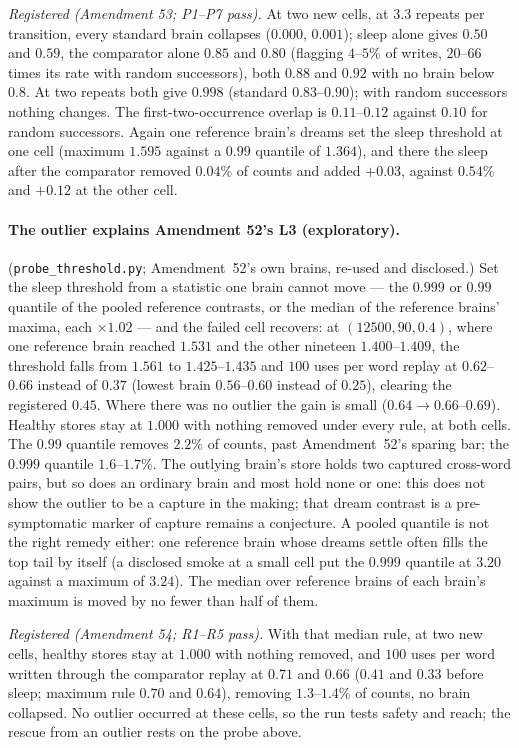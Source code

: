 \documentclass[11pt]{article}
\theoremstyle{definition}
\theoremstyle{plain}
\begin{document}
\emph{Registered (Amendment 53; P1--P7 pass).} At two new cells, at $3.3$
repeats per transition, every standard brain collapses ($0.000$, $0.001$); sleep
alone gives $0.50$ and $0.59$, the comparator alone $0.85$ and $0.80$ (flagging
$4$--$5\%$ of writes, $20$--$66$ times its rate with random successors), both
$0.88$ and $0.92$ with no brain below $0.8$. At two repeats both give $0.998$
(standard $0.83$--$0.90$); with random successors nothing changes. The
first-two-occurrence overlap is $0.11$--$0.12$ against $0.10$ for random
successors. Again one reference brain's dreams set the sleep threshold at one
cell (maximum $1.595$ against a $0.99$ quantile of $1.364$), and there the sleep
after the comparator removed $0.04\%$ of counts and added $+0.03$, against
$0.54\%$ and $+0.12$ at the other cell.

\paragraph{The outlier explains Amendment 52's L3 (exploratory).}
(\texttt{probe\_threshold.py}; Amendment~52's own brains, re-used and disclosed.)
Set the sleep threshold from a statistic one brain cannot move --- the $0.999$ or
$0.99$ quantile of the pooled reference contrasts, or the median of the
reference brains' maxima, each $\times 1.02$ --- and the failed cell recovers:
at $(12500,90,0.4)$, where one reference brain reached $1.531$ and the other
nineteen $1.400$--$1.409$, the threshold falls from $1.561$ to $1.425$--$1.435$ and
$100$ uses per word replay at $0.62$--$0.66$ instead of $0.37$ (lowest brain $0.56$--$0.60$
instead of $0.25$), clearing the registered $0.45$. Where there was no outlier the
gain is small ($0.64 \to 0.66$--$0.69$). Healthy stores stay at $1.000$ with nothing
removed under every rule, at both cells. The $0.99$ quantile removes $2.2\%$ of
counts, past Amendment~52's sparing bar; the $0.999$ quantile $1.6$--$1.7\%$. The
outlying brain's store holds two captured cross-word pairs, but so does an
ordinary brain and most hold none or one: this does not show the outlier to be
a capture in the making; that dream contrast is a pre-symptomatic marker of
capture remains a conjecture. A pooled quantile is not the right remedy either:
one reference brain whose dreams settle often fills the top tail by itself
(a disclosed smoke at a small cell put the $0.999$ quantile at $3.20$ against a
maximum of $3.24$). The median over reference brains of each brain's maximum is
moved by no fewer than half of them.

\emph{Registered (Amendment 54; R1--R5 pass).} With that median rule, at two new
cells, healthy stores stay at $1.000$ with nothing removed, and $100$ uses per
word written through the comparator replay at $0.71$ and $0.66$ ($0.41$ and $0.33$
before sleep; maximum rule $0.70$ and $0.64$), removing $1.3$--$1.4\%$ of counts, no
brain collapsed. No outlier occurred at these cells, so the run tests safety
and reach; the rescue from an outlier rests on the probe above.
\end{document}
